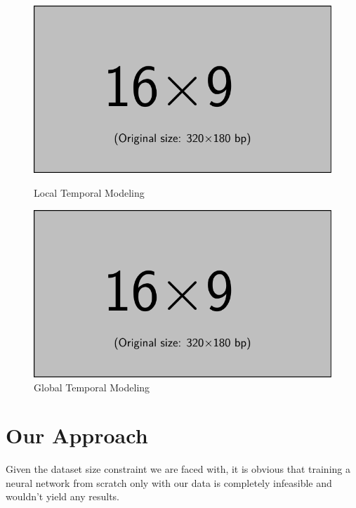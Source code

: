 \begin{figure}[t]
    \centering
    \begin{minipage}{0.49\textwidth}
        \centering
        \includegraphics[width=\textwidth]{assets/mwe/example-image-16x9}
        \caption{Local Temporal Modeling}
        \label{figure:local-temporal-modeling}
    \end{minipage}
    \hfill
    \begin{minipage}{0.49\textwidth}
        \centering
        \includegraphics[width=\textwidth]{assets/mwe/example-image-16x9}
        \caption{Global Temporal Modeling}
        \label{figure:global-temporal-modeling}
    \end{minipage}
\end{figure}

\section{Our Approach}

Given the dataset size constraint we are faced with, it is obvious that training a neural network from scratch only with our data is completely infeasible and wouldn't yield any results.

